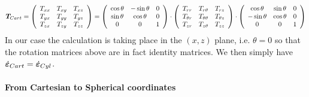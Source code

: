 \[
{\bm T}_{\tiny Cart}=
\left(
\begin{array}{ccc}
T_{xx} & T_{xy} & T_{xz} \\
T_{yx} & T_{yy} & T_{yz} \\
T_{zx} & T_{zy} & T_{zz} 
\end{array}
\right)
=
\left(
\begin{array}{ccc}
 \cos \theta&-\sin \theta&0 \\
\sin \theta&\cos \theta&0 \\
0 & 0 & 1 
\end{array}
\right)
\cdot
\left(
\begin{array}{ccc}
T_{rr}       & T_{r\theta}      & T_{rz} \\
T_{\theta r} & T_{\theta\theta} & T_{\theta z} \\
T_{z r}      & T_{z \theta}     & T_{zz}
\end{array}
\right)
\cdot
\left(
\begin{array}{ccc}
\cos \theta & \sin \theta&0 \\
-\sin \theta &  \cos \theta&0 \\
0 & 0 & 1 
\end{array}
\right)
\]
In our case the calculation is taking place in the $(x,z)$
plane, i.e. $\theta=0$ so that the rotation matrices above 
are in fact identity matrices. 
We then simply have 
$\dot{\bm \varepsilon}_{\tiny Cart}=
\dot{\bm \varepsilon}_{\tiny Cyl}$.


\paragraph{From Cartesian to Spherical coordinates}

